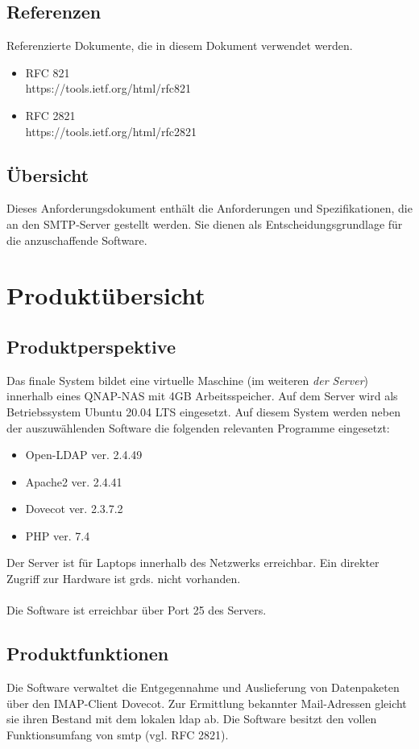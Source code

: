 \subsection{Referenzen}
Referenzierte Dokumente, die in diesem Dokument verwendet werden.
\begin{itemize}
	\citereset
	\item RFC 821 \\
	https://tools.ietf.org/html/rfc821 
	\item RFC 2821\\
	https://tools.ietf.org/html/rfc2821
	\citereset
\end{itemize}



\subsection{Übersicht}
Dieses Anforderungsdokument enthält die Anforderungen und Spezifikationen, die an den SMTP-Server gestellt werden.
Sie dienen als Entscheidungsgrundlage für die anzuschaffende Software.

\section{Produktübersicht}
\subsection{Produktperspektive}
Das finale System bildet eine virtuelle Maschine (im weiteren \textit{der Server}) innerhalb eines QNAP-NAS mit 4GB Arbeitsspeicher.
Auf dem Server wird als Betriebssystem Ubuntu 20.04 LTS eingesetzt. Auf diesem System werden neben der auszuwählenden Software die folgenden relevanten Programme eingesetzt:
\begin{itemize}
	\item Open-LDAP ver. 2.4.49
	\item Apache2 ver. 2.4.41
	\item Dovecot ver. 2.3.7.2
	\item PHP ver. 7.4
\end{itemize} 
Der Server ist für Laptops innerhalb des Netzwerks erreichbar. Ein direkter Zugriff zur Hardware ist grds. nicht vorhanden.\\
\\
Die Software ist erreichbar über Port 25 des Servers.  

\subsection{Produktfunktionen}
Die Software verwaltet die Entgegennahme und Auslieferung von Datenpaketen über den IMAP-Client Dovecot.
Zur Ermittlung bekannter Mail-Adressen gleicht sie ihren Bestand mit dem lokalen \ac{ldap} ab.
Die Software besitzt den vollen Funktionsumfang von \ac{smtp} (vgl. RFC 2821).

